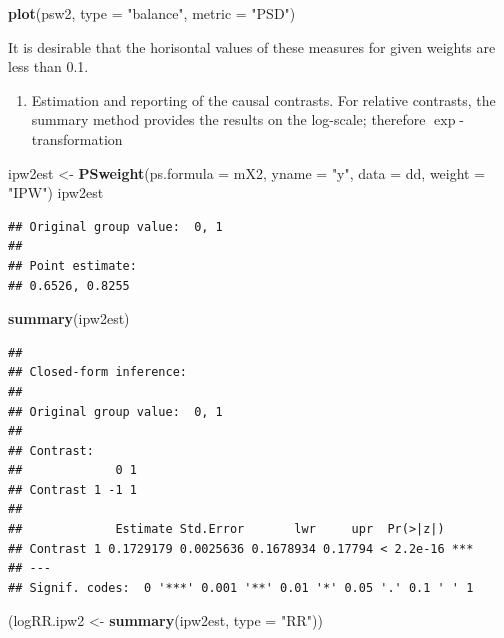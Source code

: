 \documentclass[
]{book}
\newenvironment{Shaded}{\begin{snugshade}}{\end{snugshade}}
\newcommand{\AttributeTok}[1]{\textcolor[rgb]{0.13,0.29,0.53}{#1}}
\newcommand{\FunctionTok}[1]{\textcolor[rgb]{0.13,0.29,0.53}{\textbf{#1}}}
\newcommand{\NormalTok}[1]{#1}
\newcommand{\OtherTok}[1]{\textcolor[rgb]{0.56,0.35,0.01}{#1}}
\newcommand{\StringTok}[1]{\textcolor[rgb]{0.31,0.60,0.02}{#1}}
\providecommand{\tightlist}{%
  \setlength{\itemsep}{0pt}\setlength{\parskip}{0pt}}
\begin{document}
\begin{Shaded}
\begin{Highlighting}[]
\FunctionTok{plot}\NormalTok{(psw2, }\AttributeTok{type =} \StringTok{"balance"}\NormalTok{, }\AttributeTok{metric =} \StringTok{"PSD"}\NormalTok{)}
\end{Highlighting}
\end{Shaded}

It is desirable that the horisontal values of
these measures for given weights are less than 0.1.

\begin{enumerate}
\def\labelenumi{\arabic{enumi}.}
\setcounter{enumi}{2}
\tightlist
\item
  Estimation and reporting of the causal contrasts. For relative
  contrasts, the summary method provides the results
  on the log-scale; therefore \(\exp\)-transformation
\end{enumerate}

\begin{Shaded}
\begin{Highlighting}[]
\NormalTok{ipw2est }\OtherTok{\textless{}{-}} \FunctionTok{PSweight}\NormalTok{(}\AttributeTok{ps.formula =}\NormalTok{ mX2, }\AttributeTok{yname =} \StringTok{"y"}\NormalTok{, }\AttributeTok{data =}\NormalTok{ dd, }\AttributeTok{weight =} \StringTok{"IPW"}\NormalTok{)}
\NormalTok{ipw2est}
\end{Highlighting}
\end{Shaded}

\begin{verbatim}
## Original group value:  0, 1 
## 
## Point estimate: 
## 0.6526, 0.8255
\end{verbatim}

\begin{Shaded}
\begin{Highlighting}[]
\FunctionTok{summary}\NormalTok{(ipw2est)}
\end{Highlighting}
\end{Shaded}

\begin{verbatim}
## 
## Closed-form inference: 
## 
## Original group value:  0, 1 
## 
## Contrast: 
##             0 1
## Contrast 1 -1 1
## 
##             Estimate Std.Error       lwr     upr  Pr(>|z|)    
## Contrast 1 0.1729179 0.0025636 0.1678934 0.17794 < 2.2e-16 ***
## ---
## Signif. codes:  0 '***' 0.001 '**' 0.01 '*' 0.05 '.' 0.1 ' ' 1
\end{verbatim}

\begin{Shaded}
\begin{Highlighting}[]
\NormalTok{(logRR.ipw2 }\OtherTok{\textless{}{-}} \FunctionTok{summary}\NormalTok{(ipw2est, }\AttributeTok{type =} \StringTok{"RR"}\NormalTok{))}
\end{Highlighting}
\end{Shaded}
\end{document}
